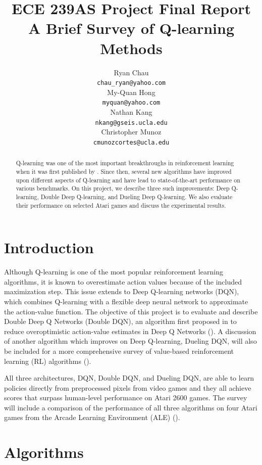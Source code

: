 \documentclass{article}
\title{ECE 239AS Project Final Report \\ A Brief Survey of Q-learning Methods}
\author{%
    Ryan Chau \\
    \texttt{chau\_ryan@yahoo.com}\\
    \And
    My-Quan Hong \\
    \texttt{myquan@yahoo.com} \\
    \And
    Nathan Kang \\
    \texttt{nkang@gseis.ucla.edu} \\
    \And
    Christopher Munoz \\
    \texttt{cmunozcortes@ucla.edu} \\
}
\begin{document}
\maketitle

\begin{abstract}
    Q-learning was one of the most important breakthroughs in reinforcement
    learning when it was first published by \cite{watkins1989learning}. Since
    then, several new algorithms have improved upon different aspects of
    Q-learning and have lead to state-of-the-art performance on various
    benchmarks. On this project, we describe three such improvements: Deep
    Q-learning, Double Deep Q-learning, and Dueling Deep Q-learning. We also
    evaluate their performance on selected Atari games and discuss the
    experimental results.
\end{abstract}

\section{Introduction}
Although Q-learning is one of the most popular reinforcement learning
algorithms, it is known to overestimate action values because of the included
maximization step. This issue extends to Deep Q-learning networks (DQN), which
combines Q-learning with a flexible deep neural network to approximate the
action-value function. The objective of this project is to evaluate and describe
Double Deep Q Networks (Double DQN), an algorithm first proposed in
\citet{van2016deep} to reduce overoptimistic action-value estimates in Deep Q
Networks (\cite{mnih2015human}). A discussion of another algorithm which
improves on Deep Q-learning, Dueling DQN, will also be included for a more
comprehensive survey of value-based reinforcement learning (RL) algorithms
(\cite{wang2016dueling}).

All three architectures, DQN, Double DQN, and Dueling DQN, are able to learn
policies directly from preprocessed pixels from video games and they all achieve
scores that surpass human-level performance on Atari 2600 games.  The survey
will include a comparison of the performance of all three algorithms on four
Atari games from the Arcade Learning Environment (ALE)
(\cite{bellemare2013arcade}).

\section{Algorithms}
\end{document}
